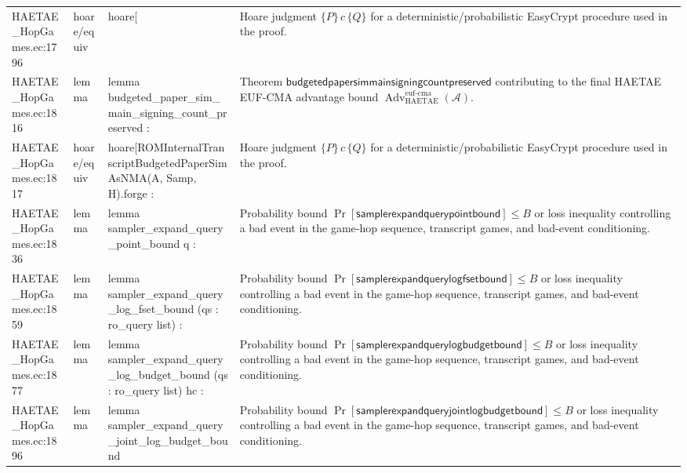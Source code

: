 \documentclass[10pt]{article}
\newcommand{\Adv}{\operatorname{Adv}}
\begin{document}
\begin{longtable}{L{0.11\textwidth}L{0.055\textwidth}L{0.385\textwidth}L{0.41\textwidth}}
HAETAE\_\allowbreak{}HopGames.\allowbreak{}ec:\allowbreak{}1796 & hoare/equiv & {\ttfamily\scriptsize hoare[} & Hoare judgment $\{P\}\,c\,\{Q\}$ for a deterministic/probabilistic EasyCrypt procedure used in the proof. \\
HAETAE\_\allowbreak{}HopGames.\allowbreak{}ec:\allowbreak{}1816 & lemma & {\ttfamily\scriptsize lemma budgeted\_\allowbreak{}paper\_\allowbreak{}sim\_\allowbreak{}main\_\allowbreak{}signing\_\allowbreak{}count\_\allowbreak{}preserved :} & Theorem $\mathsf{budgetedpapersimmainsigningcountpreserved}$ contributing to the final HAETAE EUF-CMA advantage bound $\Adv_{\mathrm{HAETAE}}^{\mathrm{euf\mbox{-}cma}}(\mathcal A)$. \\
HAETAE\_\allowbreak{}HopGames.\allowbreak{}ec:\allowbreak{}1817 & hoare/equiv & {\ttfamily\scriptsize hoare[ROMInternalTranscriptBudgetedPaperSimAsNMA(A, Samp, H).forge :} & Hoare judgment $\{P\}\,c\,\{Q\}$ for a deterministic/probabilistic EasyCrypt procedure used in the proof. \\
HAETAE\_\allowbreak{}HopGames.\allowbreak{}ec:\allowbreak{}1836 & lemma & {\ttfamily\scriptsize lemma sampler\_\allowbreak{}expand\_\allowbreak{}query\_\allowbreak{}point\_\allowbreak{}bound q :} & Probability bound $\Pr[\mathsf{samplerexpandquerypointbound}]\le B$ or loss inequality controlling a bad event in the game-hop sequence, transcript games, and bad-event conditioning. \\
HAETAE\_\allowbreak{}HopGames.\allowbreak{}ec:\allowbreak{}1859 & lemma & {\ttfamily\scriptsize lemma sampler\_\allowbreak{}expand\_\allowbreak{}query\_\allowbreak{}log\_\allowbreak{}fset\_\allowbreak{}bound (qs : ro\_\allowbreak{}query list) :} & Probability bound $\Pr[\mathsf{samplerexpandquerylogfsetbound}]\le B$ or loss inequality controlling a bad event in the game-hop sequence, transcript games, and bad-event conditioning. \\
HAETAE\_\allowbreak{}HopGames.\allowbreak{}ec:\allowbreak{}1877 & lemma & {\ttfamily\scriptsize lemma sampler\_\allowbreak{}expand\_\allowbreak{}query\_\allowbreak{}log\_\allowbreak{}budget\_\allowbreak{}bound (qs : ro\_\allowbreak{}query list) hc :} & Probability bound $\Pr[\mathsf{samplerexpandquerylogbudgetbound}]\le B$ or loss inequality controlling a bad event in the game-hop sequence, transcript games, and bad-event conditioning. \\
HAETAE\_\allowbreak{}HopGames.\allowbreak{}ec:\allowbreak{}1896 & lemma & {\ttfamily\scriptsize lemma sampler\_\allowbreak{}expand\_\allowbreak{}query\_\allowbreak{}joint\_\allowbreak{}log\_\allowbreak{}budget\_\allowbreak{}bound} & Probability bound $\Pr[\mathsf{samplerexpandqueryjointlogbudgetbound}]\le B$ or loss inequality controlling a bad event in the game-hop sequence, transcript games, and bad-event conditioning. \\

\end{longtable}
\end{document}
